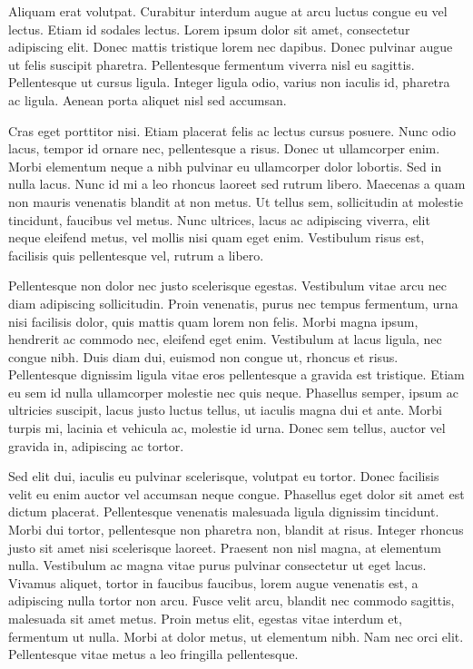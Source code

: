 \documentclass[twoside]{ritsi/report}
\begin{document}
Aliquam erat volutpat. Curabitur interdum augue at arcu luctus congue eu vel lectus. Etiam id sodales lectus. Lorem ipsum dolor sit amet, consectetur adipiscing elit. Donec mattis tristique lorem nec dapibus. Donec pulvinar augue ut felis suscipit pharetra. Pellentesque fermentum viverra nisl eu sagittis. Pellentesque ut cursus ligula. Integer ligula odio, varius non iaculis id, pharetra ac ligula. Aenean porta aliquet nisl sed accumsan.

Cras eget porttitor nisi. Etiam placerat felis ac lectus cursus posuere. Nunc odio lacus, tempor id ornare nec, pellentesque a risus. Donec ut ullamcorper enim. Morbi elementum neque a nibh pulvinar eu ullamcorper dolor lobortis. Sed in nulla lacus. Nunc id mi a leo rhoncus laoreet sed rutrum libero. Maecenas a quam non mauris venenatis blandit at non metus. Ut tellus sem, sollicitudin at molestie tincidunt, faucibus vel metus. Nunc ultrices, lacus ac adipiscing viverra, elit neque eleifend metus, vel mollis nisi quam eget enim. Vestibulum risus est, facilisis quis pellentesque vel, rutrum a libero.

Pellentesque non dolor nec justo scelerisque egestas. Vestibulum vitae arcu nec diam adipiscing sollicitudin. Proin venenatis, purus nec tempus fermentum, urna nisi facilisis dolor, quis mattis quam lorem non felis. Morbi magna ipsum, hendrerit ac commodo nec, eleifend eget enim. Vestibulum at lacus ligula, nec congue nibh. Duis diam dui, euismod non congue ut, rhoncus et risus. Pellentesque dignissim ligula vitae eros pellentesque a gravida est tristique. Etiam eu sem id nulla ullamcorper molestie nec quis neque. Phasellus semper, ipsum ac ultricies suscipit, lacus justo luctus tellus, ut iaculis magna dui et ante. Morbi turpis mi, lacinia et vehicula ac, molestie id urna. Donec sem tellus, auctor vel gravida in, adipiscing ac tortor.

Sed elit dui, iaculis eu pulvinar scelerisque, volutpat eu tortor. Donec facilisis velit eu enim auctor vel accumsan neque congue. Phasellus eget dolor sit amet est dictum placerat. Pellentesque venenatis malesuada ligula dignissim tincidunt. Morbi dui tortor, pellentesque non pharetra non, blandit at risus. Integer rhoncus justo sit amet nisi scelerisque laoreet. Praesent non nisl magna, at elementum nulla. Vestibulum ac magna vitae purus pulvinar consectetur ut eget lacus. Vivamus aliquet, tortor in faucibus faucibus, lorem augue venenatis est, a adipiscing nulla tortor non arcu. Fusce velit arcu, blandit nec commodo sagittis, malesuada sit amet metus. Proin metus elit, egestas vitae interdum et, fermentum ut nulla. Morbi at dolor metus, ut elementum nibh. Nam nec orci elit. Pellentesque vitae metus a leo fringilla pellentesque.
\end{document}
